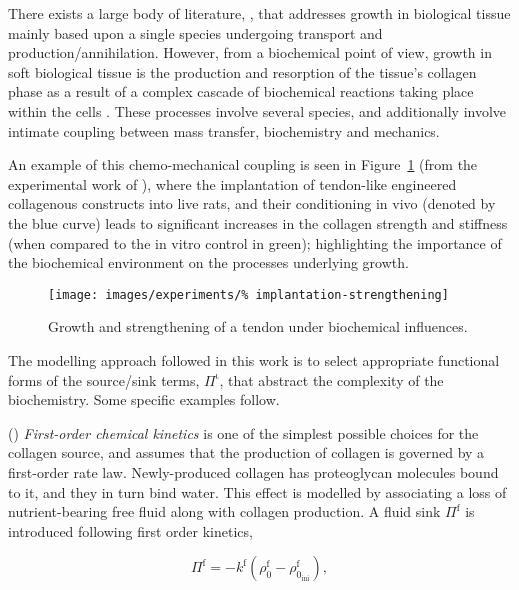 There exists a large body of literature, \citep{CowinHegedus:76,
  EpsteinMaugin:2000, AmbrosiMollica:2002}, that addresses growth in
biological tissue mainly based upon a single species undergoing
transport and production/annihilation. However, from a biochemical
point of view, growth in soft biological tissue is the production and
resorption of the tissue's collagen phase as a result of a complex
cascade of biochemical reactions taking place within the cells
\citep{Alberts:02}. These processes involve several species, and
additionally involve intimate coupling between mass transfer,
biochemistry and mechanics.

An example of this chemo-mechanical coupling is seen in
Figure~\ref{implantation-strengthening} (from the experimental work of
\citet{calveetal:07}), where the implantation of tendon-like
engineered collagenous constructs into live rats, and their
conditioning in vivo (denoted by the blue curve) leads to significant
increases in the collagen strength and stiffness (when compared to the
in vitro control in green); highlighting the importance of the
biochemical environment on the processes underlying growth.

\begin{figure}
  \centering
  \texttt{[image: images/experiments/\%
    implantation-strengthening]}
  \caption{Growth and strengthening of a tendon under biochemical
    influences.}
  \label{implantation-strengthening}
\end{figure}

The modelling approach followed in this work is to select appropriate
functional forms of the source/sink terms, $\Pi^{\mathrm{\iota}}$,
that abstract the complexity of the biochemistry. Some specific
examples follow.

() {\em First-order chemical kinetics} is one of the
simplest possible choices for the collagen source, and assumes that
the production of collagen is governed by a first-order rate
law. Newly-produced collagen has proteoglycan molecules bound to it,
and they in turn bind water. This effect is modelled by associating a
loss of nutrient-bearing free fluid along with collagen production. A
fluid sink $\Pi^\mathrm{f}$ is introduced following first order
kinetics,

\begin{equation}
\Pi^\mathrm{f} = -k^\mathrm{f}(\rho_0^\mathrm{f} -
\rho_{0_\mathrm{ini}}^\mathrm{f}),
\label{first-order-chemical-kinetics-source}
\end{equation}


